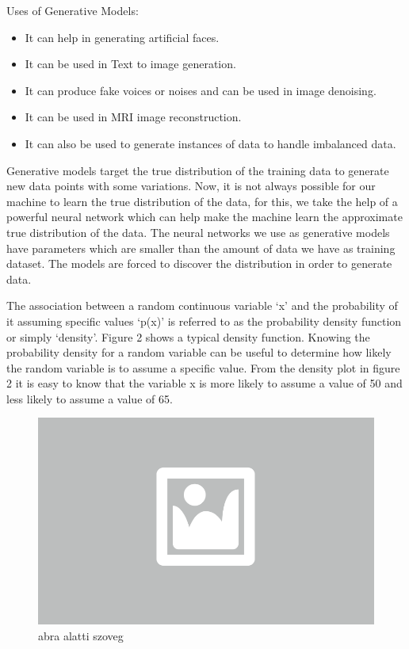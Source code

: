 Uses of Generative Models:
\begin{itemize}
	\item It can help in generating artificial faces.
	\item It can be used in Text to image generation.
	\item It can produce fake voices or noises and can be used in image denoising.
	\item It can be used in MRI image reconstruction.
	\item It can also be used to generate instances of data to handle imbalanced data.
\end{itemize}

Generative models target the true distribution of the training data to generate new data points with some variations. Now, it is not always possible for our machine to learn the true distribution of the data, for this, we take the help of a powerful neural network which can help make the machine learn the approximate true distribution of the data.
The neural networks we use as generative models have parameters which are smaller than the amount of data we have as training dataset. The models are forced to discover the distribution in order to generate data.


The association between a random continuous variable ‘x’ and the probability of it assuming specific values ‘p(x)’ is referred to as the probability density function or simply ‘density’. Figure 2 shows a typical density function. Knowing the probability density for a random variable can be useful to determine how likely the random variable is to assume a specific value. From the density plot in figure 2 it is easy to know that the variable x is more likely to assume a value of 50 and less likely to assume a value of 65.

\begin{figure}[ht]
	\centering
	\includegraphics[width=0.65\columnwidth]{figures/abra.png}
	\caption{abra alatti szoveg}
\end{figure}

